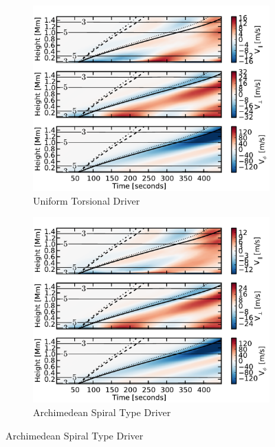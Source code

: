 \begin{figure}
    \begin{subfigure}[b]{0.49\textwidth}
        \includegraphics[width=\columnwidth]{Chapter4/Figs/TD_wave_speeds_Suni_p240_A10_r30_B0.pdf}
        \caption{Uniform Torsional Driver}
        \label{fig:All_TD_wave_30:Suni}
    \end{subfigure}
    \begin{subfigure}[b]{0.49\textwidth}
        \includegraphics[width=\columnwidth]{Chapter4/Figs/TD_wave_speeds_Sarch_p240_A10_r30_B0005.pdf}
        \caption{Archimedean Spiral Type Driver}
        \label{fig:All_TD_wave_30:Sarch}
    \end{subfigure}
    

\end{figure}
